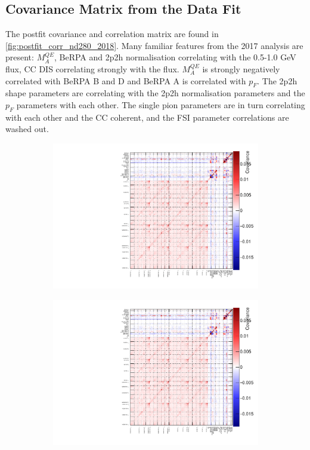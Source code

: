 \subsection{Covariance Matrix from the Data Fit}
The postfit covariance and correlation matrix are found in \autoref{fig:postfit_corr_nd280_2018}. Many familiar features from the 2017 analysis are present: $M_A^{QE}$, BeRPA and 2p2h normalisation correlating with the 0.5-1.0 GeV flux, CC DIS correlating strongly with the flux. $M_A^{QE}$ is strongly negatively correlated with BeRPA B and D and BeRPA A is correlated with $p_F$. The 2p2h shape parameters are correlating with the 2p2h normalisation parameters and the $p_F$ parameters with each other. The single pion parameters are in turn correlating with each other and the CC coherent, and the FSI parameter correlations are washed out.
\begin{figure}[h]
		\begin{subfigure}[t]{0.49\textwidth}
			\includegraphics[width=\textwidth, trim={0mm 0mm 0mm 0mm}, clip,page=5]{figures/mach3/2018/data/2018a_FixedCov_RedCov_Mpi_Data_merge_drawCorr}
		\end{subfigure}
		\begin{subfigure}[t]{0.49\textwidth}
			\includegraphics[width=\textwidth, trim={0mm 0mm 0mm 0mm}, clip,page=6]{figures/mach3/2018/data/2018a_FixedCov_RedCov_Mpi_Data_merge_drawCorr}

\end{subfigure}
\end{figure}
